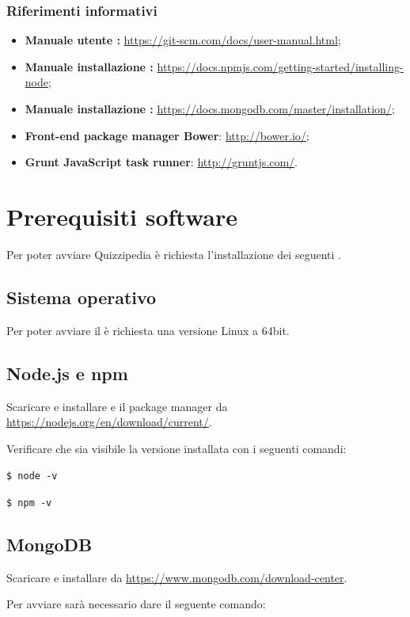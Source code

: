 \documentclass[a4paper, titlepage]{article}
\begin{document}
	\subsubsection{Riferimenti informativi}
	\begin{itemize}
		\item \textbf{Manuale utente :} \url{https://git-scm.com/docs/user-manual.html};
		\item \textbf{Manuale installazione :} \url{https://docs.npmjs.com/getting-started/installing-node};
		\item \textbf{Manuale installazione :} \url{https://docs.mongodb.com/master/installation/};
		\item \textbf{Front-end package manager Bower}: \url{http://bower.io/};
		\item \textbf{Grunt JavaScript task runner}: \url{http://gruntjs.com/}.
	\end{itemize}
	\newpage
	
	\section{Prerequisiti software}
	Per poter avviare Quizzipedia è richiesta l'installazione dei seguenti .
	
	\subsection{Sistema operativo}
	Per poter avviare il  è richiesta una versione Linux  a 64bit.
	
	\subsection{Node.js e npm}
	Scaricare e installare  e il package manager  da \url{https://nodejs.org/en/download/current/}.
	
	Verificare che sia visibile la versione installata con i seguenti comandi:
	
	\texttt{\$ node -v}
	
	\texttt{\$ npm -v}

	\subsection{MongoDB}
	Scaricare e installare  da \url{https://www.mongodb.com/download-center}.
	
	Per avviare  sarà necessario dare il seguente comando:
	
\end{document}
